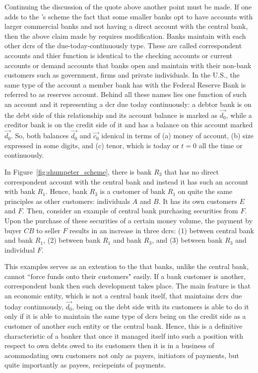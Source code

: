 Continuing the discussion of the quote above another point must be made. If one adds to the \citeauthor{schumpeter2014}'s scheme the fact that some smaller banks opt to have accounts with larger commercial banks and not having a direct account with the central bank, then the above claim made by \citeauthor{schumpeter2014} requires modification. Banks maintain with each other \acfp{dcr} of the due-today-continuously type. These are called correspondent accounts and thier function is identical to the checking accounts or current accounts or demand accounts that banks open and maintain with their non-bank customers such as government, firms and private individuals. In the U.S., the same type of the account a member bank has with the Federal Reserve Bank is referred to as reserves account. Behind all these names lies one function of such an account and it representing a \acf{dcr} due today continuously: a debtor bank is on the debt side of this relationship and its account balance is marked as $\overrightarrow{d_0}$, while a creditor bank is on the credit side of it and has a balance on this account marked $\overrightarrow{d_0}$. So, both balances $\overrightarrow{d_0}$ and $\overrightarrow{c_0}$ idenical in terms of (a) money of account, (b) size expressed in some digits, and (c) tenor, which is today or $t=0$ all the time or continuously.

In Figure~\ref{fig:shumpeter_scheme}, there is bank $R_3$ that has no direct correspondent account with the central bank and instead it has such an account with bank $R_1$. Hence, bank $R_3$ is a customer of bank $R_1$ on quite the same principles as other customers: individuals $A$ and $B$. It has its own customers $E$ and $F$. Then, consider an example of central bank purchasing securities from $F$. Upon the purchase of these securities of a certain money volume, the payment by buyer $CB$ to seller $F$ results in an increase in three \acfp{dcr}: (1) between central bank and bank $R_1$, (2) between bank $R_1$ and bank $R_3$, and (3) between bank $R_3$ and individual $F$. 

This examples serves as an extention to the \citeauthor{schumpeter2014} that banks, unlike the central bank, cannot ``force funds onto their customers" easily. If a bank customer is another, correspondent bank then such development takes place. The main feature is that an economic entity, which is not a central bank itself, that maintains \acfp{dcr} due today continuously, $\overrightarrow{d_0}$, being on the debt side with its customers is able to do it only if it is able to maintain the same type of \acp{dcr} being on the credit side as a customer of another such entity or the central bank. Hence, this is a definitive characteristic of a banker that once it managed itself into such a position with respect to own debts owed to its customers then it is in a business of acommodating own customers not only as payers, initiators of payments, but quite importantly as payees, reciepeints of payments.

